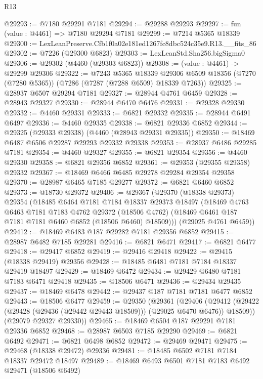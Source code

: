 \begin{lexlean}{R13}
\begin{coremodule}
@29293 := @7180 @29291 @7181
@29294 := @29288 @29293
@29297 := fun (value : @4461) => @7180 @29294 @7181
@29299 := @7214 @5365 @18339
@29300 := LexLeanPreserve.Cfb1f0a02e181ed1267fc8dbc524c35e9.R13.__fits_86
@29302 := @7226 (@29300 @6823)
@29303 := LexLeanStd.Sha256.bigSigma0
@29306 := @29302 (@4460 (@29303 @6823))
@29308 := (value : @4461) -> @29299 @29306
@29322 := @7243
    @5365
    @18339
    @29306
    @6509
    @18356
    (@7270 (@7280 @5365))
    (@7286 (@7287 (@7288 @6509) @18339 @7263))
@29325 := @28937 @6507 @29294 @7181
@29327 := @28944 @4761 @6459
@29328 := @28943 @29327
@29330 := @28944 @6470 @6476
@29331 := @29328 @29330
@29332 := @4460 @29331
@29333 := @6821 @29332
@29335 := @28944 @6491 @6497
@29336 := @4460 @29335
@29338 := @6821 @29336 @6852
@29344 := @29325 (@29333 @29338) (@4460 (@28943 @29331 @29335))
@29350 := @18469 @6487 @6506 @29287 @29293 @29332 @29338
@29353 := @28937 @6486 @29285 @7181
@29354 := @4460 @29327
@29355 := @6821 @29354
@29356 := @4460 @29330
@29358 := @6821 @29356 @6852
@29361 := @29353 (@29355 @29358) @29332
@29367 := @18469 @6466 @6485 @29278 @29284 @29354 @29358
@29370 := @28987 @6465 @7185 @29277
@29372 := @6821 @6460 @6852
@29373 := @18730 @29372
@29406 := @29367
    (@29370
      (@18338 @29373)
      @29354
      (@18485
        @6464
        @7181
        @7184
        @18337
        @29373
        @18497
        (@18469
          @4763
          @6463
          @7181
          @7183
          @4762
          @29372
          (@18506 @4762)
          (@18469 @6461 @187 @7181 @7181 @6460 @6852 (@18506 @6460) @18509)))
      (@29025 @4761 @6459))
@29412 := @18469 @6483 @187 @29282 @7181 @29356 @6852
@29415 := @28987 @6482 @7185 @29281
@29416 := @6821 @6471
@29417 := @6821 @6477
@29418 := @29417 @6852
@29419 := @29416 @29418
@29422 := @29415 (@18338 @29419) @29356
@29428 := @18485 @6481 @7181 @7184 @18337 @29419 @18497
@29429 := @18469 @6472
@29434 := @29429 @6480 @7181 @7183 @6471 @29418
@29435 := @18506 @6471
@29436 := @29434 @29435
@29437 := @18469 @6478
@29442 := @29437 @187 @7181 @7181 @6477 @6852
@29443 := @18506 @6477
@29459 := @29350
    (@29361
      (@29406
        (@29412 (@29422 (@29428 (@29436 (@29442 @29443 @18509))) (@29025 @6470 @6476)) @18509))
      (@29079 @29327 @29330))
@29465 := @18469 @6504 @187 @29291 @7181 @29336 @6852
@29468 := @28987 @6503 @7185 @29290
@29469 := @6821 @6492
@29471 := @6821 @6498 @6852
@29472 := @29469 @29471
@29475 := @29468 (@18338 @29472) @29336
@29481 := @18485 @6502 @7181 @7184 @18337 @29472 @18497
@29489 := @18469 @6493 @6501 @7181 @7183 @6492 @29471 (@18506 @6492)

\end{coremodule}
\end{lexlean}
